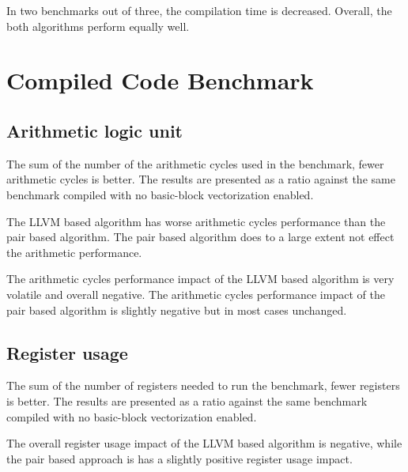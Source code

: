 \documentclass[12pt,a4paper,onecolumn,twoside,openright]{report}
\begin{document}
\begin{center}
\end{center}

In two benchmarks out of three, the compilation time is decreased. Overall, the both algorithms perform equally well.

\section{Compiled Code Benchmark}


\subsection{Arithmetic logic unit}
The sum of the number of the arithmetic cycles used in the benchmark, fewer arithmetic cycles is better. The results are presented as a ratio against the same benchmark compiled with no basic-block vectorization enabled.

\begin{center}
\end{center}

The LLVM based algorithm has worse arithmetic cycles performance than the pair based algorithm. The pair based algorithm does to a large extent not effect the arithmetic performance.

\begin{center}
\end{center}

The arithmetic cycles performance impact of the LLVM based algorithm is very volatile and overall negative.
The arithmetic cycles performance impact of the pair based algorithm is slightly negative but in most cases unchanged.


\subsection{Register usage}
The sum of the number of registers needed to run the benchmark, fewer registers is better. The results are presented as a ratio against the same benchmark compiled with no basic-block vectorization enabled.

\begin{center}
\end{center}

The overall register usage impact of the LLVM based algorithm is negative, while the pair based approach is has a slightly positive register usage impact.
\end{document}
